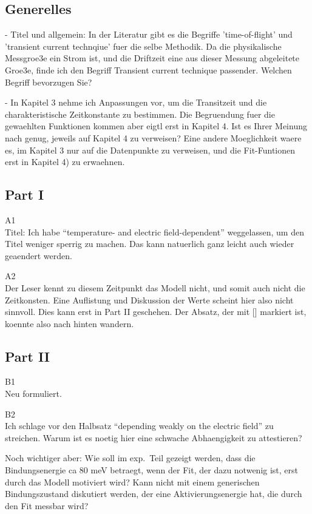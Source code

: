 

\subsection{Generelles}
- Titel und allgemein: 
In der Literatur gibt es die Begriffe  'time-of-flight' und 'transient current technqiue' fuer die selbe Methodik. 
Da die physikalische Messgroe3e ein Strom ist, und die Driftzeit eine aus dieser Messung abgeleitete Groe3e, finde ich den Begriff Transient current technique passender. Welchen Begriff bevorzugen Sie?

- In Kapitel 3 nehme ich Anpassungen vor, um die Transitzeit und die charakteristische Zeitkonstante zu bestimmen. 
Die Begruendung fuer die gewaehlten Funktionen kommen aber eigtl erst in Kapitel 4. 
Ist es Ihrer Meinung nach genug, jeweils auf Kapitel 4 zu verweisen? 
Eine andere Moeglichkeit waere es, im Kapitel 3 nur auf die Datenpunkte zu verweisen, und die Fit-Funtionen erst in Kapitel 4) zu erwaehnen. 

\subsection{Part I}


A1\\
Titel: Ich habe ``temperature- and electric field-dependent'' weggelassen, um den Titel weniger sperrig zu machen. 
Das kann natuerlich ganz leicht auch wieder geaendert werden. 

A2\\
Der Leser kennt zu diesem Zeitpunkt das Modell nicht, und somit auch nicht die Zeitkonsten. 
Eine Auflistung und Diskussion der Werte scheint hier also nicht sinnvoll. 
Dies kann erst in Part II geschehen. 
Der Absatz, der mit [] markiert ist, koennte also nach hinten wandern. 


\subsection{Part II}

B1\\
Neu formuliert.

B2\\
Ich schlage vor den Halbsatz ``depending weakly on the electric field'' zu streichen. Warum ist es noetig hier eine schwache Abhaengigkeit zu attestieren?

Noch wichtiger aber: Wie soll im exp.\ Teil gezeigt werden, dass die Bindungsenergie ca 80 meV betraegt, wenn der Fit, der dazu notwenig ist, erst durch das Modell motiviert wird?
Kann nicht mit einem generischen Bindungszustand diskutiert werden, der eine Aktivierungsenergie hat, die durch den Fit messbar wird? 

